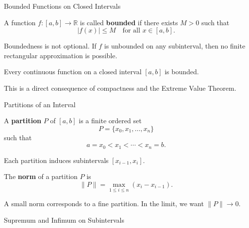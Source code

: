 \documentclass[12pt, a4paper]{article}
\begin{document}
\clearpage

\begin{heading}
Bounded Functions on Closed Intervals
\end{heading}

\begin{definition}
A function $f:[a,b]\to\mathbb{R}$ is called \textbf{bounded} if there exists $M>0$ such that
\[
|f(x)|\le M \quad \text{for all } x\in[a,b].
\]
\end{definition}

Boundedness is not optional.
If $f$ is unbounded on any subinterval, then no finite rectangular approximation is possible.

\vspace{100pt}

\begin{theorem}
Every continuous function on a closed interval $[a,b]$ is bounded.
\end{theorem}

This is a direct consequence of compactness and the Extreme Value Theorem.

\clearpage

\begin{heading}
Partitions of an Interval
\end{heading}

\begin{definition}[Partition]
A \textbf{partition} $P$ of $[a,b]$ is a finite ordered set
\[
P=\{x_0,x_1,\dots,x_n\}
\]
such that
\[
a=x_0<x_1<\cdots<x_n=b.
\]
\end{definition}

Each partition induces subintervals $[x_{i-1},x_i]$.

\clearpage

\begin{definition}
The \textbf{norm} of a partition $P$ is
\[
\|P\|=\max_{1\le i\le n}(x_i-x_{i-1}).
\]
\end{definition}

A small norm corresponds to a fine partition.
In the limit, we want $\|P\|\to 0$.

\clearpage

\begin{heading}
Supremum and Infimum on Subintervals
\end{heading}
\end{document}

